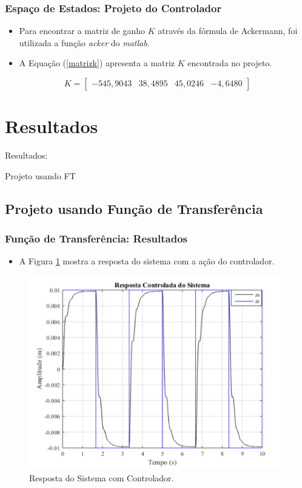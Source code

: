\documentclass{beamer}
\begin{document}
\begin{frame}
\frametitle{Espaço de Estados: Projeto do Controlador}
\begin{itemize}
\item Para encontrar a matriz de ganho $K$ através da fórmula de Ackermann, foi utilizada a função \textit{acker} do \textit{matlab}.
\item A Equação (\ref{matrizk}) apresenta a matriz $K$ encontrada no projeto.
\end{itemize}

\begin{equation}\label{matrizk}
K = \left[ \begin{matrix}
-545,9043 & 38,4895 & 45,0246 & -4,6480
\end{matrix} \right]
\end{equation}
\end{frame}

\section{Resultados}
\begin{frame}
\Huge{\centerline{Resultados:}}
\Huge{\centerline{Projeto usando FT}}
\end{frame}
\subsection{Projeto usando Função de Transferência}
\begin{frame}
\frametitle{Função de Transferência: Resultados}
\begin{itemize}
\item A Figura \ref{mfechadacontrolada} mostra a resposta do sistema com a ação do controlador.
\end{itemize}
\begin{figure}[H]
	\centering
\includegraphics[width=.5\columnwidth]{./imagens/resposta_controlada.pdf}
    \renewcommand{\figurename}{Fig. 7}
    \caption{Resposta do Sistema com Controlador.}
	\label{mfechadacontrolada}
\end{figure}
\end{frame}
\end{document}
